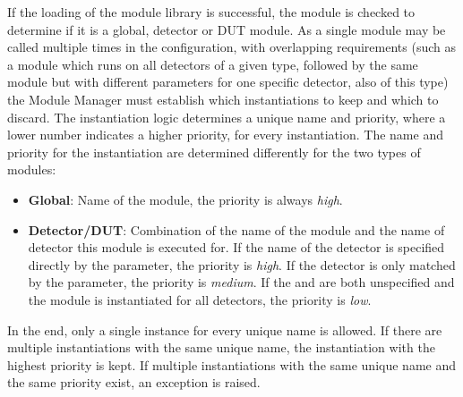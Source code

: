 If the loading of the module library is successful, the module is checked to determine if it is a global, detector or DUT module.
As a single module may be called multiple times in the configuration, with overlapping requirements (such as a module which runs on all detectors of a given type, followed by the same module but with different parameters for one specific detector, also of this type) the Module Manager must establish which instantiations to keep and which to discard.
The instantiation logic determines a unique name and priority, where a lower number indicates a higher priority, for every instantiation.
The name and priority for the instantiation are determined differently for the two types of modules:
\begin{itemize}
\item \textbf{Global}: Name of the module, the priority is always \emph{high}.
\item \textbf{Detector/DUT}: Combination of the name of the module and the name of detector this module is executed for.
If the name of the detector is specified directly by the  parameter, the priority is \emph{high}.
If the detector is only matched by the  parameter, the priority is \emph{medium}.
If the  and  are both unspecified and the module is instantiated for all detectors, the priority is \emph{low}.
\end{itemize}
In the end, only a single instance for every unique name is allowed.
If there are multiple instantiations with the same unique name, the instantiation with the highest priority is kept.
If multiple instantiations with the same unique name and the same priority exist, an exception is raised.

